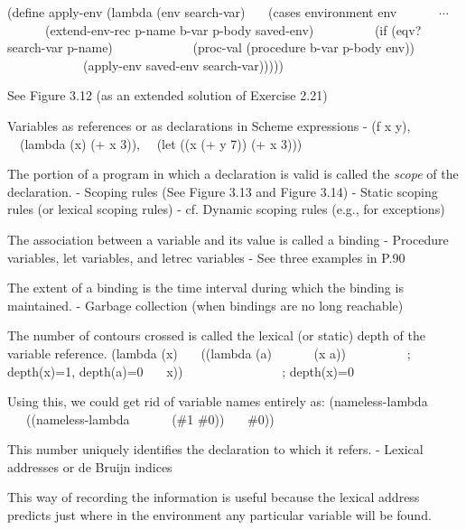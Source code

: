 \documentclass{article}
\begin{document}
\begin{huge}
(define apply-env (lambda (env search-var) \al
\ \ \ (cases environment env \al
\ \ \ \ \ \ $\cdots$ \al
\ \ \ \ \ \ (extend-env-rec p-name b-var p-body saved-env) \al
\ \ \ \ \ \ \ \ \ (if (eqv? search-var p-name) \al
\ \ \ \ \ \ \ \ \ \ \ \ (proc-val (procedure b-var p-body env)) \al
\ \ \ \ \ \ \ \ \ \ \ \ (apply-env saved-env search-var)))))

See Figure 3.12 (as an extended solution of Exercise 2.21)


Variables as references or as declarations in Scheme expressions \al
- (f x y), \ \ (lambda (x) (+ x 3)), \ \ (let ((x (+ y 7)) (+ x 3)))

The portion of a program in which a declaration is valid is called 
the {\it scope} of the declaration. \al
- Scoping rules (See Figure 3.13 and Figure 3.14) \al
- Static scoping rules (or lexical scoping rules) \al
- cf. Dynamic scoping rules (e.g., for exceptions)

The association between a variable and its value is called a binding \al
- Procedure variables, let variables, and letrec variables \al
- See three examples in P.90

The extent of a binding is the time interval during which the binding 
is maintained. \al
- Garbage collection (when bindings are no long reachable)


The number of contours crossed is called the lexical (or static) depth
of the variable reference. \al
(lambda (x) \al
\ \ \ ((lambda (a) \al
\ \ \ \ \ \ (x a)) \ \ \ \ \ \ \ \ \ ; depth(x)=1, depth(a)=0 \al
\ \ \ x)) \ \ \ \ \ \ \ \ \ \ \ \ \ \ \  ; depth(x)=0 

Using this, we could get rid of variable names entirely as: \al
(nameless-lambda \al
\ \ \ ((nameless-lambda \al
\ \ \ \ \ \ (\#1 \#0)) \al
\ \ \ \#0)) 

This number uniquely identifies the declaration to which it refers. \al
- Lexical addresses or de Bruijn indices


This way of recording the information is useful because 
the lexical address predicts just where in the environment 
any particular variable will be found.


\end{huge}
\end{document}

